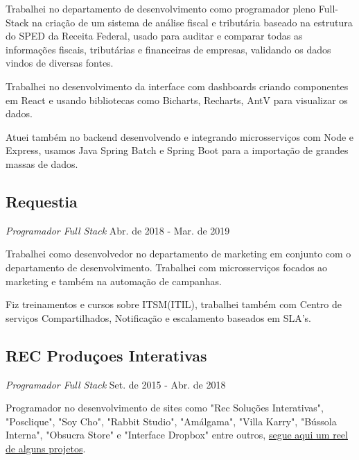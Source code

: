 \documentclass[a4paper,10pt]{article}
\begin{document}
Trabalhei no departamento de desenvolvimento como programador pleno Full-Stack
na criação de um sistema de análise fiscal e tributária
baseado na estrutura do SPED da Receita Federal,
usado para auditar e comparar todas as informações fiscais,
tributárias e financeiras de empresas,
validando os dados vindos de diversas fontes.

Trabalhei no desenvolvimento da interface com dashboards
criando componentes em React e usando bibliotecas como
Bicharts, Recharts, AntV para visualizar os dados.

Atuei também no backend desenvolvendo e integrando microsserviços com Node e Express,
usamos Java Spring Batch e Spring Boot para a importação de grandes massas de dados.

\clearpage

\subsection*{Requestia}
\textcolor{corSubSection}{\emph{Programador Full Stack}}
\hfill \textcolor{corSubSection}{Abr. de 2018 - Mar. de 2019}

Trabalhei como desenvolvedor no departamento de marketing
em conjunto com o departamento de desenvolvimento.
Trabalhei com microsserviços focados ao marketing
e também na automação de campanhas.

Fiz treinamentos e cursos sobre ITSM(ITIL),
trabalhei também com Centro de serviços Compartilhados,
Notificação e escalamento baseados em SLA's.

\subsection*{REC Produçoes Interativas}
\textcolor{corSubSection}{\emph{Programador Full Stack}}
\hfill \textcolor{corSubSection}{Set. de 2015 - Abr. de 2018}

Programador no desenvolvimento de sites como "Rec Soluções Interativas",
"Posclique", "Soy Cho", "Rabbit Studio", "Amálgama", "Villa Karry",
"Bússola Interna", "Obsucra Store" e "Interface Dropbox" entre outros,
\href{https://www.youtube.com/watch?v=V_ahsuHgIoE}{segue aqui um reel de alguns projetos}.

%
\end{document}
